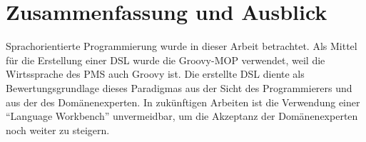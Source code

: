 \documentclass[11pt,english,ngerman, headsepline]{scrreprt}
\begin{document}
\chapter{Zusammenfassung und Ausblick}

Sprachorientierte Programmierung wurde in dieser Arbeit betrachtet. Als
Mittel für die Erstellung einer DSL wurde die Groovy-MOP verwendet, weil die
Wirtssprache des PMS auch Groovy ist. Die erstellte DSL
diente als Bewertungsgrundlage dieses Paradigmas aus der Sicht des
Programmierers und aus der des Domänenexperten. 
In zukünftigen Arbeiten ist die Verwendung einer ``Language Workbench''\cite{fowler2005language}
unvermeidbar, um die Akzeptanz der Domänenexperten noch weiter zu steigern.
 
 

\clearpage{}
\appendix
\renewcommand{\theequation}{A-\arabic{equation}}

\setcounter{equation}{0}  %




\end{document}
